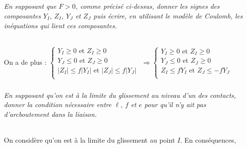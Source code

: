 \documentclass[10pt,fleqn]{article} %
\begin{document}
\begin{multicols}{2}
%
%
%

\else
\fi


\subparagraph{}\textit{En supposant que $F > 0$, comme précisé ci-dessus, donner  les signes des composantes  $Y_I$, $Z_I$, $Y_J$ et $Z_J$ puis écrire,  en utilisant  le modèle  de Coulomb, les inéquations  qui lient ces composantes.}
\ifprof
\begin{corrige} ~\\
On a de plus : 
$
\left\{
\begin{array}{l}
Y_I \geq 0 \text{ et } Z_I \geq 0 \\
Y_J \leq 0 \text{ et } Z_J \geq 0 \\
|Z_I|\leq f|Y_I| \text{ et }  |Z_J|\leq f|Y_J| \\
\end{array}
\right.$
$ \Rightarrow 
\left\{
\begin{array}{l}
Y_I \geq 0 \text{ et } Z_I \geq 0 \\
Y_J \leq 0 \text{ et } Z_J \geq 0 \\
Z_I\leq fY_I \text{ et }  Z_J\leq -fY_J \\
\end{array}
\right.$


\end{corrige}
\else
\fi

\subparagraph{}\textit{En supposant qu’on est à  la limite du glissement au niveau d’un des contacts, donner la condition nécessaire entre $\ell$, $f$ et $e$ pour qu’il n’y ait pas d’arcboutement dans la liaison.}

\ifprof
\begin{corrige}~\\

On considère qu'on est à la limite du glissement au point $I$.  En conséquences, 


\end{corrige}
\end{multicols}
\end{document}
